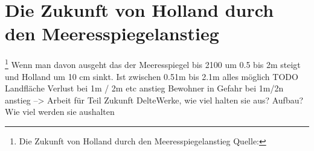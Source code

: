 \section{Die Zukunft von Holland durch den Meeresspiegelanstieg} \footnote{Die Zukunft von Holland durch den Meeresspiegelanstieg Quelle: }
Wenn man davon ausgeht das der Meeresspiegel bis 2100 um 0.5 bis 2m steigt und Holland um 10 cm sinkt.
Ist zwischen 0.51m bis 2.1m alles möglich 
\newline
\newline
\color{red}  
TODO \newline
Landfläche Verlust bei 1m / 2m etc anstieg
Bewohner in Gefahr bei 1m/2n anstieg
--> Arbeit für Teil Zukunft
\newline
DelteWerke, wie viel halten sie aus?
Aufbau? Wie viel werden sie aushalten
\color{black}  